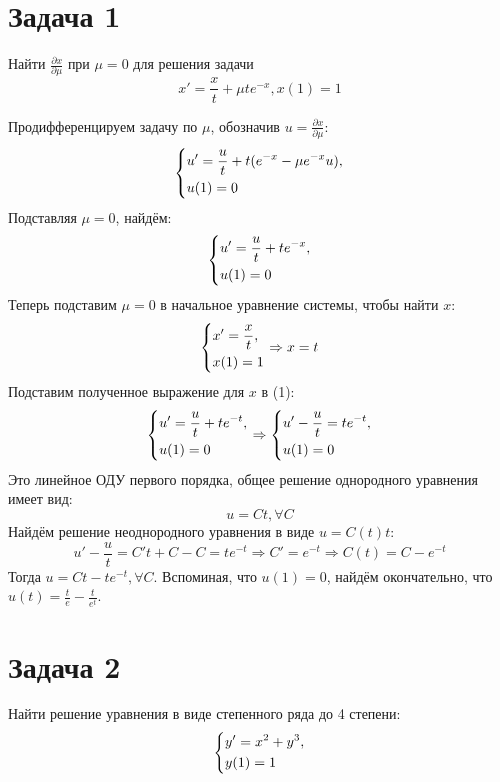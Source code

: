 \documentclass[11pt]{article}
\author{Sergey Makarov}
\date{\today}
\title{}
\begin{document}
\section{Задача 1}
\label{sec:orgf23e3d3}
Найти \(\frac{\partial x}{\partial\mu}\) при \(\mu = 0\) для решения задачи
$$x' = \frac{x}t + \mu te^{-x}, x(1) = 1$$

Продифференцируем задачу по \(\mu\), обозначив \(u = \frac{\partial x}{\partial\mu}\):
\begin{equation*}
\begin{dcases}
u' = \frac ut + t(e^{-x} - \mu e^{-x}u), \\
u(1) = 0
\end{dcases}
\end{equation*}
Подставляя \(\mu = 0\), найдём:
\begin{equation}
\begin{dcases}
u' = \frac{u}t + te^{-x}, \\
u(1) = 0
\end{dcases}
\end{equation}
Теперь подставим \(\mu = 0\) в начальное уравнение системы, чтобы найти \(x\):
\begin{equation*}
\begin{dcases}
x' = \frac{x}t, \\
x(1) = 1
\end{dcases}
\Rightarrow x = t
\end{equation*}
Подставим полученное выражение для \(x\) в (1):
\begin{equation*}
\begin{dcases}
u' = \frac{u}t + te^{-t}, \\
u(1) = 0
\end{dcases}
\Rightarrow
\begin{dcases}
u' - \frac{u}t = te^{-t}, \\
u(1) = 0
\end{dcases}
\end{equation*}
Это линейное ОДУ первого порядка, общее решение однородного уравнения имеет вид:
$$u = Ct, \forall C$$
Найдём решение неоднородного уравнения в виде \(u = C(t)t\):
\begin{equation*}
u' - \frac{u}t = C't + C - C = te^{-t} \Rightarrow C' = e^{-t} \Rightarrow C(t) = C - e^{-t}
\end{equation*}
Тогда \(u = Ct - te^{-t}, \forall C\).
Вспоминая, что \(u(1) = 0\), найдём окончательно, что \(u(t) = \frac{t}e - \frac{t}{e^t}\).
\section{Задача 2}
\label{sec:org353f77a}
Найти решение уравнения в виде степенного ряда до 4 степени:
\begin{equation*}
\begin{dcases}
y' = x^2 + y^3, \\
y(1) = 1
\end{dcases}
\end{equation*}
\end{document}
